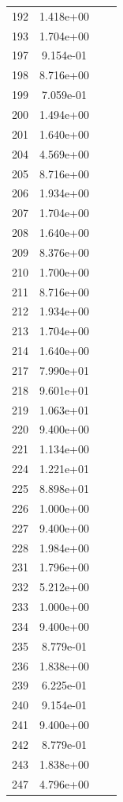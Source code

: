 \documentclass[12pt]{article}
\begin{document}
\begin{longtable}{@{}cccc@{}}
192 & 1.418e+00 &  &  \\
193 & 1.704e+00 &  &  \\
197 & 9.154e-01 &  &  \\
198 & 8.716e+00 &  &  \\
199 & 7.059e-01 &  &  \\
200 & 1.494e+00 &  &  \\
201 & 1.640e+00 &  &  \\
204 & 4.569e+00 &  &  \\
205 & 8.716e+00 &  &  \\
206 & 1.934e+00 &  &  \\
207 & 1.704e+00 &  &  \\
208 & 1.640e+00 &  &  \\
209 & 8.376e+00 &  &  \\
210 & 1.700e+00 &  &  \\
211 & 8.716e+00 &  &  \\
212 & 1.934e+00 &  &  \\
213 & 1.704e+00 &  &  \\
214 & 1.640e+00 &  &  \\
217 & 7.990e+01 &  &  \\
218 & 9.601e+01 &  &  \\
219 & 1.063e+01 &  &  \\
220 & 9.400e+00 &  &  \\
221 & 1.134e+00 &  &  \\
224 & 1.221e+01 &  &  \\
225 & 8.898e+01 &  &  \\
226 & 1.000e+00 &  &  \\
227 & 9.400e+00 &  &  \\
228 & 1.984e+00 &  &  \\
231 & 1.796e+00 &  &  \\
232 & 5.212e+00 &  &  \\
233 & 1.000e+00 &  &  \\
234 & 9.400e+00 &  &  \\
235 & 8.779e-01 &  &  \\
236 & 1.838e+00 &  &  \\
239 & 6.225e-01 &  &  \\
240 & 9.154e-01 &  &  \\
241 & 9.400e+00 &  &  \\
242 & 8.779e-01 &  &  \\
243 & 1.838e+00 &  &  \\
247 & 4.796e+00 &  &  \\

\end{longtable}
\end{document}
